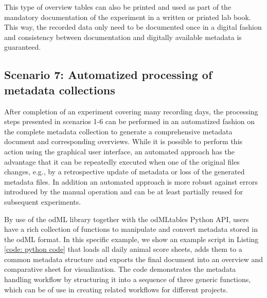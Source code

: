 This type of overview tables can also be printed and used as part of the mandatory documentation of the experiment in a written or printed lab book. This way, the recorded data only need to be documented once in a digital fashion and consistency between documentation and digitally available metadata is guaranteed. 

\subsection*{Scenario 7: Automatized processing of metadata collections}
After completion of an experiment covering many recording days, the processing steps presented in scenarios 1-6 can be performed in an automatized fashion on the complete metadata collection to generate a comprehensive metadata document and corresponding overviews. While it is possible to perform this action using the graphical user interface, an automated approach has the advantage that it can be repeatedly executed when one of the original files changes, e.g., by a retrospective update of metadata or loss of the generated metadata files. In addition an automated approach is more robust against errors introduced by the manual operation and can be at least partially reused for subsequent experiments.

By use of the odML library together with the odMLtables Python API, users have a rich collection of functions to manipulate and convert metadata stored in the odML format. In this specific example, we show an example script in Listing \ref{code: python code} that loads all daily animal score sheets, adds them to a common metadata structure and exports the final document into an overview and comparative  sheet for visualization. The code demonstrates the metadata handling workflow by structuring it into a sequence of three generic functions, which can be of use in creating related workflows for different projects.





